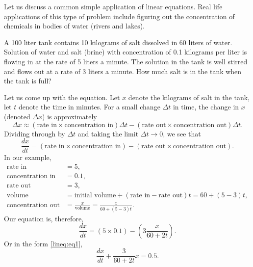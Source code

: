 \begin{example}
Let us discuss a common
simple application of linear equations.
Real life applications of this type of problem include
figuring out the concentration of
chemicals in bodies of water (rivers and lakes).

\begin{mywrapfigsimp}{1.60in}{1.65in}
\noindent
{}
\end{mywrapfigsimp}
A 100 liter tank contains 10 kilograms of salt dissolved in 60 liters of
water.  Solution of water and salt (brine) with concentration of 0.1
kilograms per
liter is flowing in at the rate of 5 liters a minute.  The solution
in the tank is well stirred and flows out at a rate of 3 liters a minute.
How much salt is in the tank when the tank is full?

Let us come up with the equation.  Let $x$ denote the kilograms of salt in the tank,
let $t$ denote the time in minutes.  For a small change $\Delta t$ in
time, the change in $x$ (denoted $\Delta x$) is approximately
\begin{equation*}
\Delta x \approx
(\text{rate in} \times \text{concentration in}) \Delta t - 
(\text{rate out} \times \text{concentration out}) \Delta t .
\end{equation*}
Dividing through by $\Delta t$ and
taking the limit $\Delta t \to 0$, we see that
\begin{equation*}
\frac{dx}{dt} =
(\text{rate in} \times \text{concentration in})  - 
(\text{rate out} \times \text{concentration out}) .
\end{equation*}
In our example,
\begin{equation*}
\begin{aligned}
\text{rate in} &= 5 , \\
\text{concentration in} &= 0.1 , \\
\text{rate out} &= 3 , \\
\text{volume} &= \text{initial volume} + (\text{rate in} - \text{rate out})t
= 60+(5-3)t, \\
\text{concentration out} &= \frac{x}{\text{volume}} = \frac{x}{60+(5-3)t} .
\end{aligned}
\end{equation*}
Our equation is, therefore,
\begin{equation*}
\frac{dx}{dt} =
(5 \times 0.1)  - 
\left(3 \frac{x}{60+2t}\right) .
\end{equation*}
Or in the form \eqref{lineq:eq1},
\begin{equation*}
\frac{dx}{dt} +
\frac{3}{60+2t} x
=
0.5 .
\end{equation*}


\end{example}
